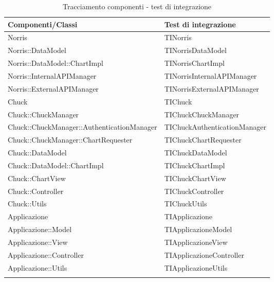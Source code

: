 	\begin{longtabu}{| X | X[0.8] |}

			\hline
			\rowfont{\bf}
			Componenti/Classi	&	Test di integrazione \\ \hline 
			\endhead


			Norris & TINorris \\ \hline 
			Norris::DataModel & TINorrisDataModel \\ \hline 
			Norris::DataModel::ChartImpl & TINorrisChartImpl \\ \hline 
			Norris::InternalAPIManager & TINorrisInternalAPIManager \\ \hline 
			Norris::ExternalAPIManager & TINorrisExternalAPIManager \\ \hline 
			Chuck & TIChuck \\ \hline 
			Chuck::ChuckManager & TIChuckChuckManager \\ \hline 
			Chuck::ChuckManager::AuthenticationManager & TIChuckAuthenticationManager \\ \hline 
			Chuck::ChuckManager::ChartRequester & TIChuckChartRequester \\ \hline 
			Chuck::DataModel & TIChuckDataModel \\ \hline 
			Chuck::DataModel::ChartImpl & TIChuckChartImpl \\ \hline 
			Chuck::ChartView & TIChuckChartView \\ \hline 
			Chuck::Controller & TIChuckController \\ \hline 
			Chuck::Utils & TIChuckUtils \\ \hline 
			Applicazione & TIApplicazione \\ \hline 
			Applicazione::Model & TIApplicazioneModel \\ \hline 
			Applicazione::View & TIApplicazioneView \\ \hline 
			Applicazione::Controller & TIApplicazioneController \\ \hline 
			Applicazione::Utils & TIApplicazioneUtils \\ \hline 




	\caption{Tracciamento componenti - test di integrazione}

\end{longtabu}
